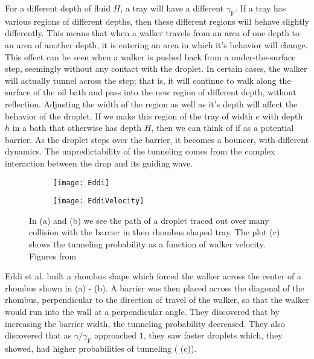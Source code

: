 For a different depth of fluid $H$, a tray will have a different $\gamma_\mathrm{F}$. If a tray has various regions of different depths, then these different regions will behave slightly differently. This means that when a walker travels from an area of one depth to an area of another depth, it is entering an area in which it's behavior will change. This effect can be seen when a walker is pushed back from a under-the-surface step, seemingly without any contact with the droplet. In certain cases, the walker will actually tunnel across the step; that is, it will continue to walk along the surface of the oil bath and pass into the new region of different depth, without reflection. Adjusting the width of the region as well as it's depth will affect the behavior of the droplet. If we make this region of the tray of width $e$ with depth $h$ in a bath that otherwise has depth $H$, then we can think of if as a potential barrier. As the droplet steps over the barrier, it becomes a bouncer, with different dynamics. The unpredictability of the tunneling comes from the complex interaction between the drop and its guiding wave. 

\begin{figure}[h!]
 \begin{subfigure}{.5\textwidth}
  \centering
  \texttt{[image: Eddi]}
\end{subfigure}
\begin{subfigure}{.7\textwidth}
  \centering
  \texttt{[image: EddiVelocity]}
\end{subfigure}
\caption{In (a) and (b) we see the path of a droplet traced out over many collision with the barrier in then rhombus shaped tray. The plot (c) shows the tunneling probability as a function of walker velocity. Figures from }
\label{fig:Eddi}
	\end{figure}

Eddi et al. built a rhombus shape which forced the walker across the center of a rhombus shown in  (a) - (b). A barrier was then placed across the diagonal of the rhombus, perpendicular to the direction of travel of the walker, so that the walker would run into the wall at a perpendicular angle. They discovered that by increasing the barrier width, the tunneling probability decreased. They also discovered that as $\gamma/\gamma_\mathrm{F}$ approached $1$, they saw faster droplets which, they showed, had higher probabilities of tunneling ( (c)). 
